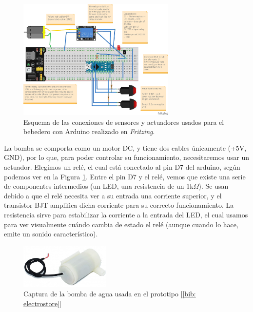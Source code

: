 \documentclass[12pt]{article}
\begin{document}
	\begin{figure}[h]
		\begin{center}
			\includegraphics[width=0.7\textwidth]{img/bebedero_test_fritzing.jpg}
			\caption{Esquema de las conexiones de sensores y actuadores usados para el bebedero con Arduino realizado en \textit{Fritzing}.}
			\label{Esquema conexiones bebedero Fritzing}
		\end{center}
	\end{figure}

	\noindent La bomba se comporta como un motor DC, y tiene dos cables únicamente (+5V, GND), por lo que, para poder controlar su funcionamiento, necesitaremos usar un actuador. Elegimos un relé, el cual está conectado al pin D7 del arduino, según podemos ver en la Figura \ref{Esquema conexiones bebedero Fritzing}. Entre el pin D7 y el relé, vemos que existe una serie de componentes intermedios (un LED, una resistencia de un 1k$\Omega$). Se usan debido a que el relé necesita ver a su entrada una corriente superior, y el transistor BJT amplifica dicha corriente para su correcto funcionamiento. La resistencia sirve para estabilizar la corriente a la entrada del LED, el cual usamos para ver visualmente cuándo cambia de estado el relé (aunque cuando lo hace, emite un sonido característico). \\
	
	\begin{figure}[h]
		\begin{center}
			\includegraphics[width=0.4\textwidth]{img/bomba_agua.jpg}
			\caption{Captura de la bomba de agua usada en el prototipo [\ref{bib: electrostore}]}
			\label{Captura bomba agua}
		\end{center}
	\end{figure}
	
\end{document}
